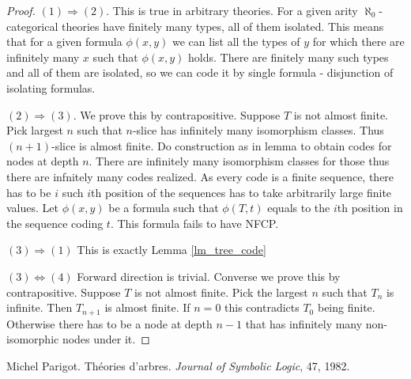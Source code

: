 \documentclass{amsart}
\begin{document}
\begin{proof}
	$(1) \Rightarrow (2)$. This is true in arbitrary theories. For a given arity $\aleph_0$-categorical theories have finitely many types, all of them isolated. This means that for a given formula $\phi(x, y)$ we can list all the types of $y$ for which there are infinitely many $x$ such that $\phi(x, y)$ holds. There are finitely many such types and all of them are isolated, so we can code it by single formula - disjunction of isolating formulas.
	
	$(2) \Rightarrow (3)$. We prove this by contrapositive. Suppose $T$ is not almost finite. Pick largest $n$ such that $n$-slice has infinitely many isomorphism classes. Thus $(n+1)$-slice is almost finite. Do construction as in lemma to obtain codes for nodes at depth $n$. There are infinitely many isomorphism classes for those thus there are infnitely many codes realized. As every code is a finite sequence, there has to be $i$ such $i$th position of the sequences has to take arbitrarily large finite values. Let $\phi(x,y)$ be a formula such that $\phi(T, t)$ equals to the $i$th position in the sequence coding $t$. This formula fails to have NFCP.
	
	$(3) \Rightarrow (1)$ This is exactly Lemma \ref{lm_tree_code} %
	
	$(3) \Leftrightarrow (4)$ Forward direction is trivial. Converse we prove this by contrapositive. Suppose $T$ is not almost finite. Pick the largest $n$ such that $T_n$ is infinite. Then $T_{n+1}$ is almost finite. If $n=0$ this contradicts $T_0$ being finite. Otherwise there has to be a node at depth $n-1$ that has infinitely many non-isomorphic nodes under it. 
\end{proof}

\begin{thebibliography}{9}

	Michel Parigot.
	Th\'eories d'arbres.
	\textit{Journal of Symbolic Logic}, 47, 1982.
	
\end{thebibliography}
\end{document}
